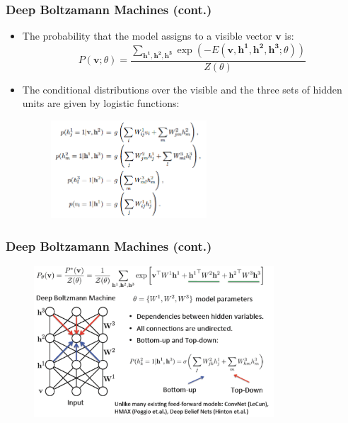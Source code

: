 \documentclass{beamer}
\begin{document}
\begin{frame}
\frametitle{Deep Boltzamann Machines (cont.)}
\begin{itemize}
\item The probability that the model assigns to a visible vector $\mathbf{v}$ is:
\begin{equation}
P(\mathbf{v};\theta)=\frac{\sum_{\mathbf{h^1,h^2,h^3}}\exp(-E(\mathbf{v, h^1, h^2, h^3};\theta))}{Z(\theta)}
\end{equation}
\item The conditional distributions over the visible and the three sets of hidden units are given by logistic functions:
\begin{figure}
\centering
  \includegraphics[width=0.55\textwidth]{figs/dbm_update.png}
\end{figure}
\end{itemize}
\end{frame}


\begin{frame}
\frametitle{Deep Boltzamann Machines (cont.)}
\begin{figure}
\centering
  \includegraphics[width=0.8\textwidth]{figs/p1.png}
\end{figure}
\end{frame}
\end{document}
